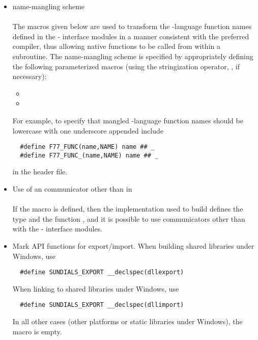\begin{itemize}
\item {\F} name-mangling scheme\\ \\
  The macros given below are used to transform the {\C}-language
  function names defined in the {\F}-{\C} interface modules in a manner
  consistent with the preferred {\F} compiler, thus allowing native
  {\C} functions to be called from within a {\F} subroutine. The
  name-mangling scheme is specified by appropriately defining
  the following parameterized macros (using the stringization operator,
  \id{\#\#}, if necessary):
  \begin{itemize}
  \item {}
  \item {}
  \end{itemize}

  For example, to specify that mangled {\C}-language function names
  should be lowercase with one underscore appended include
\begin{verbatim}
  #define F77_FUNC(name,NAME) name ## _
  #define F77_FUNC_(name,NAME) name ## _
\end{verbatim}
  in the  header file.

\item Use of an {\mpi} communicator other than  in {\F}\\ \\
  If the macro  is defined, then the
  {\mpi} implementation used to build {\sundials} defines the type
   and the function , and it is
  possible to use {\mpi} communicators other than
   with the {\F}-{\C} interface modules.

\item Mark {\sundials} API functions for export/import.
  When building shared {\sundials} libraries under Windows, use
\begin{verbatim}
  #define SUNDIALS_EXPORT __declspec(dllexport)
\end{verbatim}
  When linking to shared {\sundials} libraries under Windows, use
\begin{verbatim}
  #define SUNDIALS_EXPORT __declspec(dllimport)
\end{verbatim}
  In all other cases (other platforms or static libraries under Windows), 
  the  macro is empty.

\end{itemize}




